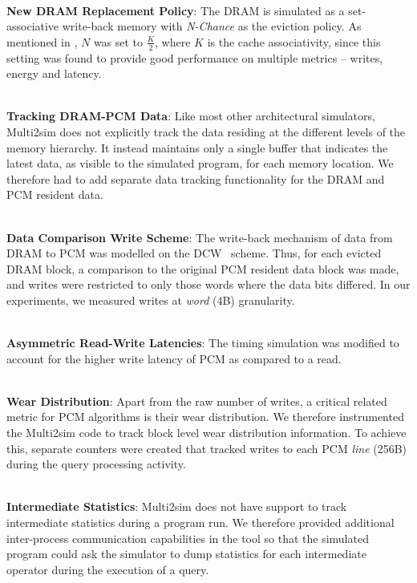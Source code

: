 \\\textbf{New DRAM Replacement Policy}: 
The DRAM is simulated as a set-associative write-back memory with
\textit{N-Chance} as the eviction policy. As mentioned in \cite{nchance},
$N$ was set to $\frac{K}{2}$, where $K$ is the cache associativity,
since this setting was found to provide good performance on multiple
metrics -- writes, energy and latency.

\\\textbf{Tracking DRAM-PCM Data}:
Like most other architectural simulators, Multi2sim does not explicitly
track the data residing at the different levels of the memory
hierarchy. It instead maintains only a single buffer that indicates
the latest data, as visible to the simulated program, for each memory
location. We therefore had to add separate data tracking functionality
for the DRAM and PCM resident data.

\\\textbf{Data Comparison Write Scheme}: 
The write-back mechanism of data from DRAM to PCM was modelled on the
DCW~\cite{write} scheme. Thus, for each evicted DRAM block, a comparison
to the original PCM resident data block was made, and writes were
restricted to only those words where the data bits differed. In our
experiments, we measured writes at \textit{word} (4B) granularity.

\\\textbf{Asymmetric Read-Write Latencies}:  
The timing simulation was modified to account for the higher write
latency of PCM as compared to a read.

\\\textbf{Wear Distribution}: 
Apart from the raw number of writes, a critical related metric for PCM
algorithms is their wear distribution. We therefore instrumented the
Multi2sim code to track block level wear distribution information. To
achieve this, separate counters were created that tracked writes to each
PCM \textit{line} (256B) during the query processing activity.

\\\textbf{Intermediate Statistics}: 
Multi2sim does not have support to track intermediate statistics during
a program run. We therefore provided additional inter-process communication capabilities in the
tool so that the simulated program could ask the simulator to dump
statistics for each intermediate operator during the execution of a query.

